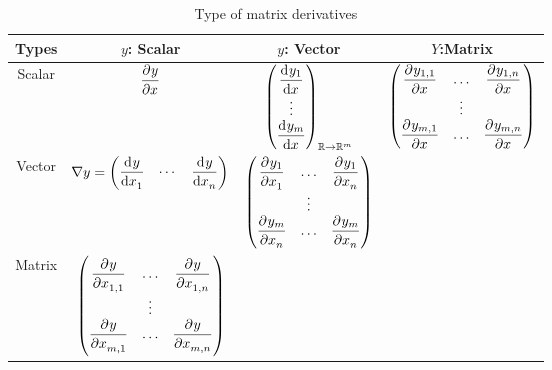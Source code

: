 \begin{table}[H]
\centering
\renewcommand*{\arraystretch}{1}
\begin{tabular}[t]{c|c|c|c}
\hline
Types & $y$: Scalar & ${y}$: Vector & $Y$:Matrix \\
\hline
Scalar & $\dpd{y}{x}$ & $\begin{pmatrix}
    \dod{y_1}{x} \\
    \vdots \\
    \dod{y_m}{x}
\end{pmatrix}_{\realnumber \rightarrow \realnumber^m} $ & $\begin{pmatrix}
            \dpd{y_{1,1}}{x} & \hdots & \dpd{y_{1,n}}{x} \\
            & \vdots \\
            \dpd{y_{m,1}}{x} & \hdots & \dpd{y_{m,n}}{x}
        \end{pmatrix}$ \\[4ex]
Vector & $\nabla y = \begin{pmatrix}
    \dod{y}{x_1} & \cdots & \dod{y}{x_n}
\end{pmatrix}$ & $\begin{pmatrix}
            \dpd{y_1}{x_1} & \hdots & \dpd{y_1}{x_n} \\
            & \vdots \\
            \dpd{y_m}{x_n} & \hdots & \dpd{y_m}{x_n}
        \end{pmatrix}$ &  \\[4ex]
Matrix & $\begin{pmatrix}
            \dpd{y}{x_{1,1}} & \hdots & \dpd{y}{x_{1,n}} \\
            & \vdots \\
            \dpd{y}{x_{m,1}} & \hdots & \dpd{y}{x_{m,n}}
        \end{pmatrix}$ &   & \\[4ex]
\end{tabular}
\caption{Type of matrix derivatives}
\end{table}


